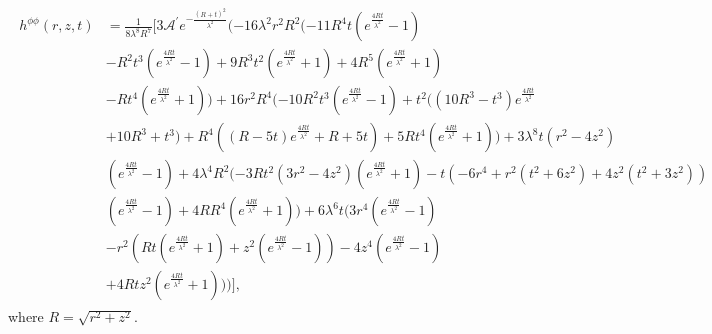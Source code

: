 \begin{align}
\begin{split}
        h^{\phi\phi}(r,z,t) &= 
\frac{1}{8 \lambda ^8 R^7}\bigg[3 \mathcal{A}^\prime e^{-\frac{(R+t)^2}{\lambda ^2}} (-16 \lambda ^2 r^2 R^2 (-11 R^4 t (e^{\frac{4 R t}{\lambda ^2}}-1) \\
&-R^2 t^3 (e^{\frac{4 R t}{\lambda ^2}}-1)+9 R^3 t^2 (e^{\frac{4 R t}{\lambda ^2}}+1)+4 R^5 (e^{\frac{4 R t}{\lambda ^2}}+1) \\
&-R t^4 (e^{\frac{4 R t}{\lambda ^2}}+1))+16 r^2 R^4 (-10 R^2 t^3 (e^{\frac{4 R t}{\lambda ^2}}-1)+t^2 ((10 R^3-t^3) e^{\frac{4 R t}{\lambda ^2}} \\
&+10 R^3+t^3)+R^4 ((R-5 t) e^{\frac{4 R t}{\lambda ^2}}+R+5 t)+5 R t^4 (e^{\frac{4 R t}{\lambda ^2}}+1))+3 \lambda ^8 t (r^2-4 z^2) \\
&(e^{\frac{4 R t}{\lambda ^2}}-1)+4 \lambda ^4 R^2 (-3 R t^2 (3 r^2-4 z^2) (e^{\frac{4 R t}{\lambda ^2}}+1)-t (-6 r^4+r^2 (t^2+6 z^2)+4 z^2 (t^2+3 z^2)) \\
&(e^{\frac{4 R t}{\lambda ^2}}-1)+4 R R^4 (e^{\frac{4 R t}{\lambda ^2}}+1))+6 \lambda ^6 t (3 r^4 (e^{\frac{4 R t}{\lambda ^2}}-1) \\
&-r^2 (R t (e^{\frac{4 R t}{\lambda ^2}}+1)+z^2 (e^{\frac{4 R t}{\lambda ^2}}-1))-4 z^4 (e^{\frac{4 R t}{\lambda ^2}}-1) \\
&+4 R t z^2 (e^{\frac{4 R t}{\lambda ^2}}+1)))\bigg],
\end{split}
\end{align}
where $R = \sqrt{r^2 + z^2}$.
